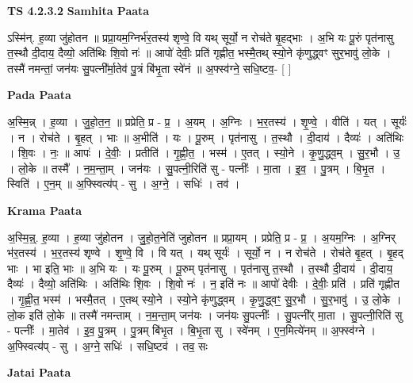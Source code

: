 \documentclass[17pt]{extarticle}
\begin{document}
\textbf{TS 4.2.3.2 } \newline
\textbf{Samhita Paata} \newline

ऽस्मि॑न्. ह॒व्या जु॑होतन ॥ प्रप्रा॒यम॒ग्निर्भ॑र॒तस्य॑ शृण्वे॒ वि यथ् सूर्यो॒ न रोच॑ते बृ॒हद्भाः । अ॒भि यः पू॒रुं पृत॑नासु त॒स्थौ दी॒दाय॒ दैव्यो॒ अति॑थिः शि॒वो नः॑ ॥ आपो॑ देवीः॒ प्रति॑ गृह्णीत॒ भस्मै॒तथ् स्यो॒ने कृ॑णुद्ध्वꣳ सुर॒भावु॑ लो॒के । तस्मै॑ नमन्तां॒ जन॑यः सु॒पत्नी᳚र्मा॒तेव॑ पु॒त्रं बि॑भृ॒ता स्वे॑नं ॥ अ॒फ्स्व॑ग्ने॒ सधि॒ष्टव॒- [  ] \newline

\textbf{Pada Paata} \newline

अ॒स्मि॒न्न् । ह॒व्या । जु॒हो॒त॒न॒ ॥ प्रप्रेति॒ प्र - प्र॒ । अ॒यम् । अ॒ग्निः । भ॒र॒तस्य॑ । शृ॒ण्वे॒ । वीति॑ । यत् । सूर्यः॑ । न । रोच॑ते । बृ॒हत् । भाः ॥ अ॒भीति॑ । यः । पू॒रुम् । पृत॑नासु । त॒स्थौ । दी॒दाय॑ । दैव्यः॑ । अति॑थिः । शि॒वः । नः॒ ॥ आपः॑ । दे॒वीः॒ । प्रतीति॑ । गृ॒ह्णी॒त॒ । भस्म॑ । ए॒तत् । स्यो॒ने । कृ॒णु॒द्ध्व॒म् । सु॒र॒भौ । उ॒ । लो॒के ॥ तस्मै᳚ । न॒म॒न्ता॒म् । जन॑यः । सु॒पत्नी॒रिति॑ सु - पत्नीः᳚ । मा॒ता । इ॒व॒ । पु॒त्रम् । बि॒भृ॒त । स्विति॑ । ए॒न॒म् ॥ अ॒फ्स्वित्य॑प् - सु । अ॒ग्ने॒ । सधिः॑ । तव॑ ।  \newline


\textbf{Krama Paata} \newline

अ॒स्मि॒न्न्॒. ह॒व्या । ह॒व्या जु॑होतन । जु॒हो॒त॒नेति॑ जुहोतन ॥ प्रप्रा॒यम् । प्रप्रेति॒ प्र - प्र॒ । अ॒यम॒ग्निः । अ॒ग्निर् भ॑र॒तस्य॑ । भ॒र॒तस्य॑ शृण्वे । शृ॒ण्वे॒ वि । वि यत् । यथ् सूर्यः॑ । सूर्यो॒ न । न रोच॑ते । रोच॑ते बृ॒हत् । बृ॒हद् भाः । भा इति॒ भाः ॥ अ॒भि यः । यः पू॒रुम् । पू॒रुम् पृत॑नासु । पृत॑नासु त॒स्थौ । त॒स्थौ दी॒दाय॑ । दी॒दाय॒ दैव्यः॑ । दैव्यो॒ अति॑थिः । अति॑थिः शि॒वः । शि॒वो नः॑ । न॒ इति॑ नः ॥ आपो॑ देवीः । दे॒वीः॒ प्रति॑ । प्रति॑ गृह्णीत । गृ॒ह्णी॒त॒ भस्म॑ । भस्मै॒तत् । ए॒तथ् स्यो॒ने । स्यो॒ने कृ॑णुद्ध्वम् । कृ॒णु॒द्ध्वꣳ॒॒ सु॒र॒भौ । सु॒र॒भावु॑ । उ॒ लो॒के । लो॒क इति॑ लो॒के ॥ तस्मै॑ नमन्ताम् । न॒म॒न्ता॒म् जन॑यः । जन॑यः सु॒पत्नीः᳚ । सु॒पत्नी᳚र् मा॒ता । सु॒पत्नी॒रिति॑ सु - पत्नीः᳚ । मा॒तेव॑ । इ॒व॒ पु॒त्रम् । पु॒त्रम् बि॑भृ॒त । बि॒भृ॒ता सु । स्वे॑नम् । ए॒न॒मित्ये॑नम् ॥ अ॒फ्स्व॑ग्ने । अ॒फ्स्वित्य॑प् - सु । अ॒ग्ने॒ सधिः॑ । सधि॒ष्टव॑ । तव॒ सः \newline

\textbf{Jatai Paata} \newline
\end{document}
